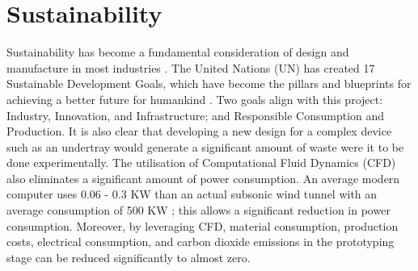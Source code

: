 \section{Sustainability}

\noindent Sustainability has become a fundamental consideration of design and manufacture in most industries \cite{Gates2021HowDisaster}. The United Nations (UN) has created 17 Sustainable Development Goals, which have become the pillars and blueprints for achieving a better future for humankind \cite{UNITEDNATIONS}. Two goals align with this project: Industry, Innovation, and Infrastructure; and Responsible Consumption and Production. It is also clear that developing a new design for a complex device such as an undertray would generate a significant amount of waste were it to be done experimentally. The utilisation of Computational Fluid Dynamics (CFD) also eliminates a significant amount of power consumption. An average modern computer uses 0.06 - 0.3  KW \cite{Anonymous2021HowEnerguide} than an actual subsonic wind tunnel with an average consumption of 500 KW \cite{Anonymous2021FAQGroup}; this allows a significant reduction in power consumption. Moreover, by leveraging CFD, material consumption, production costs, electrical consumption, and carbon dioxide emissions in the prototyping stage can be reduced significantly to almost zero. 


